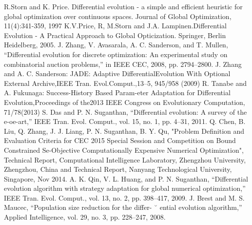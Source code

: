 \documentclass[a4paper,11pt,oneside,openany]{jsbook}
\begin{document}
\begin{thebibliography}{10}
  R.Storn and K. Price. Differential evolution - a simple and efficient heuristic for global optimization over continuous spaces. Journal of Global Optimization, 11(4):341-359, 1997
  K.V.Price, R, M.Storn and J.A. Lampinen.Differential Evolution - A Practical Approach to Global Opticization. Springer, Berlin Heidelberg, 2005.
   J. Zhang, V. Avasarala, A. C. Sanderson, and T. Mullen, “Differential
evolution for discrete optimization: An experimental study on combinatorial
auction problems,” in IEEE CEC, 2008, pp. 2794–2800.
  J. Zhang and A. C. Sanderson: JADE: Adaptive DifferentialEvolution With Optional External Archive,IEEE Tran. Evol.Comput.,13–5, 945/958 (2009)
  R. Tanabe and A. Fukunaga: Success-History Based Param-eter Adaptation for Differential Evolution,Proceedings of the2013 IEEE Congress on Evolutionary Computation, 71/78(2013)
  S. Das and P. N. Suganthan, “Differential evolution: A survey of the
e-oe-art,” IEEE Tran. Evol. Comput., vol. 15, no. 1, pp. 4–31,
2011.
  Q. Chen, B. Liu,  Q. Zhang, J. J. Liang, P. N. Suganthan, B. Y. Qu, "Problem Definition and Evaluation Criteria for CEC 2015 Special Session and Competition on Bound Constrained Se-Objective Computationally Expensive Numerical Optimization", Technical Report, Computational Intelligence Laboratory, Zhengzhou University, Zhengzhou, China  and  Technical Report, Nanyang Technological University, Singapore, Nov 2014.
   A. K. Qin, V. L. Huang, and P. N. Suganthan, “Differential evolution
algorithm with strategy adaptation for global numerical optimization,”
IEEE Tran. Evol. Comput., vol. 13, no. 2, pp. 398–417, 2009.
  J. Brest and M. S. Maucec, “Population size reduction for the differ- ˘
ential evolution algorithm,” Applied Intelligence, vol. 29, no. 3, pp.
228–247, 2008.

\end{thebibliography}
\end{document}
